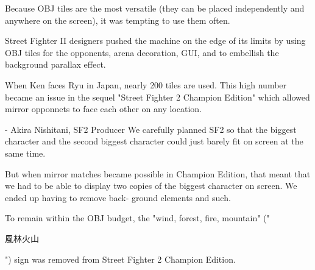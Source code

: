 Because OBJ tiles are the most versatile (they can be placed independently and anywhere on the screen), it was tempting to use them often.

Street Fighter II designers pushed the machine on the edge of its limits by using OBJ tiles for the opponents, arena decoration, GUI, and to embellish the background parallax effect.

When Ken faces Ryu in Japan, nearly 200 tiles are used. This high number became an issue in the sequel "Street Fighter 2 Champion Edition" which allowed mirror opponnets to face each other on any location.
\vfill
{}
\pagebreak

\begin{q}{- Akira Nishitani, SF2 Producer}
We carefully planned SF2 so that the biggest character and the second biggest character could just barely fit on screen at the same time. 

But when mirror matches became possible in Champion Edition, that meant that we had to be able to display two copies of the biggest character on screen. We ended up having to remove back- ground elements and such.
\end{q}
To remain within the OBJ budget, the "wind, forest, fire, mountain" ("\begin{CJK}{UTF8}{min}風林火山\end{CJK}") sign was removed from Street Fighter 2 Champion Edition.
\vfill
{}
\pagebreak

\begin{minipage}[t]{0.32\linewidth}
\end{minipage}%
\hfill%
\begin{minipage}[t]{0.32\linewidth}
\end{minipage}
\hfill%
\begin{minipage}[t]{0.32\linewidth}
\end{minipage}

\begin{minipage}[t]{0.32\linewidth}
\end{minipage}%
\hfill%
\begin{minipage}[t]{0.32\linewidth}
\end{minipage}
\hfill%
\begin{minipage}[t]{0.32\linewidth}
\end{minipage}

